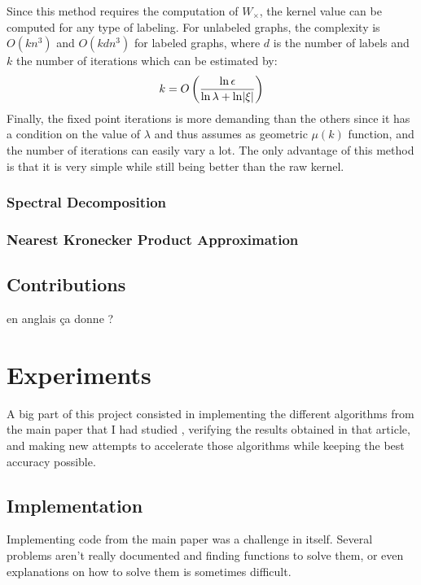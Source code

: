 \documentclass{article}
\DeclarePairedDelimiter{\abs}{\lvert}{\rvert}
\theoremstyle{definition}
\begin{document}
Since this method requires the computation of $W_\times$, the kernel value can be computed for any type of labeling. For unlabeled graphs, the complexity is $O(kn^3)$ and $O(kdn^3)$ for labeled graphs, where $d$ is the number of labels and $k$ the number of iterations which can be estimated by:
\begin{equation}
	k=O\left(\frac{\ln \epsilon}{\ln \lambda + \ln \abs{\xi}}\right)
\end{equation}
Finally, the fixed point iterations is more demanding than the others since it has a condition on the value of $\lambda$ and thus assumes as geometric $\mu(k)$ function, and the number of iterations can easily vary a lot. The only advantage of this method is that it is very simple while still being better than the raw kernel.
\subsubsection{Spectral Decomposition}

\subsubsection{Nearest Kronecker Product Approximation}

\subsection{Contributions}
en anglais ça donne ?



\section{Experiments}
A big part of this project consisted in implementing the different algorithms from the main paper that I had studied \cite{vishwanathan_graph_2010}, verifying the results obtained in that article, and making new attempts to accelerate those algorithms while keeping the best accuracy possible.
\subsection{Implementation}
Implementing code from the main paper was a challenge in itself. Several problems aren't really documented and finding functions to solve them, or even explanations on how to solve them is sometimes difficult.
\end{document}
